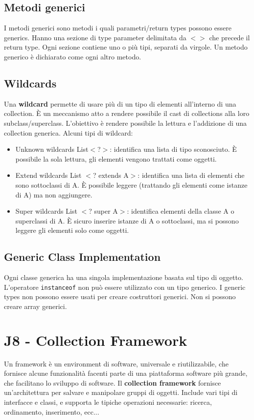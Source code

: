 \documentclass[11pt]{article}
\newcommand{\code}[1]{\texttt{#1}}
\begin{document}
\subsection{Metodi generici}
I metodi generici sono metodi i quali parametri/return types possono essere generics. Hanno una sezione di type parameter delimitata da $<>$ che precede il return type. Ogni sezione contiene uno o più tipi, separati da virgole. Un metodo generico è dichiarato come ogni altro metodo. 
\subsection{Wildcards}
Una \textbf{wildcard} permette di usare più di un tipo di elementi all'interno di una collection. È un meccanismo atto a rendere possibile il cast di collections alla loro subclass/superclass. L'obiettivo è rendere possibile la lettura e l'addizione di una collection generica. 
Alcuni tipi di wildcard:
\begin{itemize}
    \item Unknown wildcards List$<$?$>$: identifica una lista di tipo sconosciuto. È possibile la sola lettura, gli elementi vengono trattati come oggetti.
    \item Extend wildcards List $<$? extends A$>$: identifica una lista di elementi che sono sottoclassi di A. È possibile leggere (trattando gli elementi come istanze di A) ma non aggiungere.
    \item Super wildcards List $<$? super A$>$: identifica elementi della classe A o superclassi di A. È sicuro inserire istanze di A o sottoclassi, ma si possono leggere gli elementi solo come oggetti.
\end{itemize}
\subsection{Generic Class Implementation}
Ogni classe generica ha una singola implementazione basata sul tipo di oggetto. L'operatore \code{instanceof} non può essere utilizzato con un tipo generico. I generic types non possono essere usati per creare costruttori generici. Non si possono creare array generici.
\section{J8 - Collection Framework}
Un framework è un environment di software, universale e riutilizzabile, che fornisce alcune funzionalità facenti parte di una piattaforma software più grande, che facilitano lo sviluppo di software. 
Il \textbf{collection framework} fornisce un'architettura per salvare e manipolare gruppi di oggetti. Include vari tipi di interfacce e classi, e supporta le tipiche operazioni necessarie: ricerca, ordinamento, inserimento, ecc...
\end{document}
